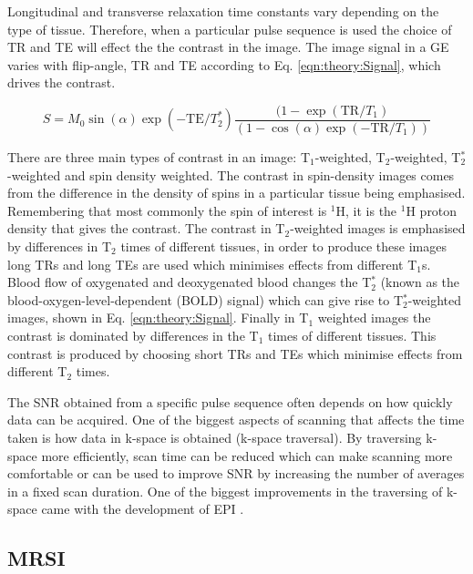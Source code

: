 Longitudinal and transverse relaxation time constants vary depending on the type of tissue. Therefore, when a particular pulse sequence is used the choice of \ac{TR} and \ac{TE} will effect the the contrast in the image. The image signal in a \ac{GE} varies with flip-angle, \ac{TR} and \ac{TE} according to Eq. \ref{eqn:theory:Signal}, which drives the contrast.

\begin{equation}
    S = M_0\sin(\alpha)\exp(-\textrm{TE}/T_2^*)\frac{(1-\exp(\textrm{TR}/T_1)}{(1-\cos(\alpha)\exp(-\textrm{TR}/T_1))}
    \label{eqn:theory:Signal}
\end{equation}

\noindent There are three main types of contrast in an image: T$_1$-weighted, T$_2$-weighted, T$_2^*$-weighted and spin density weighted. The contrast in spin-density images comes from the difference in the density of spins in a particular tissue being emphasised. Remembering that most commonly the spin of interest is $^1$H, it is the $^1$H proton density that gives the contrast. The contrast in T$_2$-weighted images is emphasised by differences in T$_2$ times of different tissues, in order to produce these images long \ac{TR}s and long \ac{TE}s are used which minimises effects from different T$_1$s. Blood flow of oxygenated and deoxygenated blood changes the T$_2^*$ (known as the blood-oxygen-level-dependent (BOLD) signal) which can give rise to T$_2^*$-weighted images, shown in Eq. \ref{eqn:theory:Signal}. Finally in T$_1$ weighted images the contrast is dominated by differences in the T$_1$ times of different tissues. This contrast is produced by choosing short \ac{TR}s and \ac{TE}s which minimise effects from different T$_2$ times. 

The \ac{SNR} obtained from a specific pulse sequence often depends on how quickly data can be acquired. One of the biggest aspects of scanning that affects the time taken is how data in k-space is obtained (k-space traversal). By traversing k-space more efficiently, scan time can be reduced which can make scanning more comfortable or can be used to improve \ac{SNR} by increasing the number of averages in a fixed scan duration. One of the biggest improvements in the traversing of k-space came with the development of \ac{EPI} \cite{Stehling1991Echo-planarSecond}.

\subsection{MRSI}

